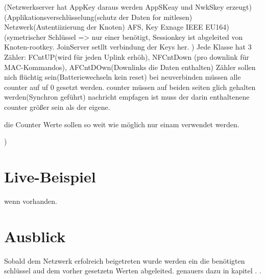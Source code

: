\documentclass[a4paper,12pt]{article}
\begin{document}
        \cite{LoRaSecur}(Netzwerkserver hat AppKey daraus werden AppSKeay und NwkSkey erzeugt)
        \cite{WhatIsLoRa}(Applikationsverschlüsselung(schutz der Daten for mitlesen) Netzwerk(Autentiizierung der Knoten) AFS, Key Exnage IEEE EU164)
        \cite{LoRaSpec}(symetrischer Schlüssel => nur einer benötigt, Sessionkey ist abgeleited von Knoten-rootkey. JoinServer setllt verbindung der Keys her.
        )
        Jede Klasse hat 3 Zähler: FCntUP(wird für jeden Uplink erhöh), NFCntDown (pro downlink für MAC-Kommandos), AFCntDOwn(Downlinks die Daten enthalten) Zähler sollen nich flüchtig sein(Batteriewechseln kein reset) bei neuverbinden müssen alle counter auf uf 0 gesetzt werden. counter müssen auf beiden seiten glich gehalten werden(Synchron geführt) nachricht empfagen ist muss der darin enthaltenene counter größer sein als der eigene. 

        die Counter Werte sollen so weit wie möglich nur einam verwendet werden.
        
        )
        \
    
    
    \section{Live-Beispiel}
        wenn vorhanden.

    \section{Ausblick}

    Sobald dem Netzwerk erfolreich beigetreten wurde werden ein die benötigten schlüssel aud dem vorher gesetzetn Werten abgeleited. genauers dazu in kapitel .
    .
        \newpage
    
    
\end{document}
